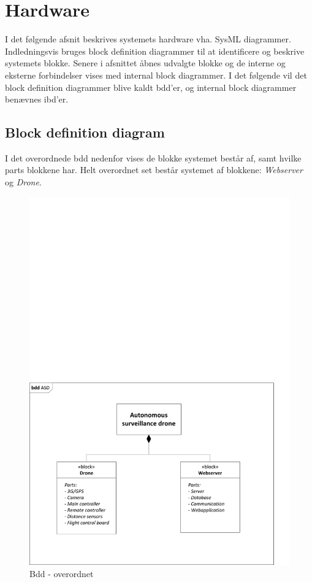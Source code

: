 \chapter{Hardware}

I det følgende afsnit beskrives systemets hardware vha. SysML diagrammer. 
Indledningsvis bruges block definition diagrammer til at identificere og beskrive systemets blokke. Senere i afsnittet åbnes udvalgte blokke og de interne og eksterne forbindelser vises med internal block diagrammer. 
I det følgende vil det block definition diagrammer blive kaldt bdd'er, og internal block diagrammer benævnes ibd'er. 

\section{Block definition diagram}
I det overordnede bdd nedenfor vises de blokke systemet består af, samt hvilke parts blokkene har. Helt overordnet set består systemet af blokkene: \textit{Webserver} og \textit{Drone}. 

\begin{figure}[H]
\centering
\includegraphics[width=1\textwidth]{Billeder/BDD/bdd_overordnet.pdf}
\vspace{-0.5cm}
\caption{Bdd - overordnet}
\label{fig:bdd_overordnet}
\end{figure}

